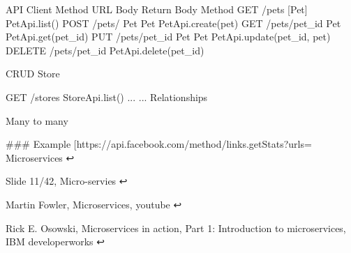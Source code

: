 API 	 Client
Method	URL	Body	Return Body	Method
 GET	/pets	 	[Pet]	PetApi.list()
 POST	/pets/	Pet	Pet	PetApi.create(pet)
 GET	/pets/pet_id	 	Pet	PetApi.get(pet_id)
 PUT	 /pets/pet_id	Pet	Pet	PetApi.update(pet_id, pet)
 DELETE	/pets/pet_id	 	 	PetApi.delete(pet_id)


CRUD Store

GET /stores	StoreApi.list()
...	...
Relationships

Many to many

### Example [https://api.facebook.com/method/links.getStats?urls=%
Microservices ↩

Slide 11/42, Micro-servies ↩

Martin Fowler, Microservices, youtube ↩

Rick E. Osowski, Microservices in action, Part 1: Introduction to microservices, IBM developerworks ↩